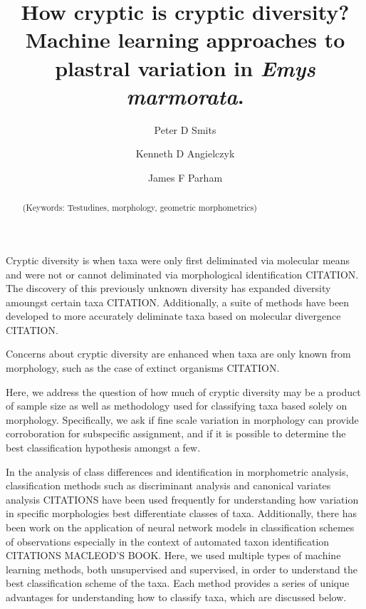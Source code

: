\documentclass[12pt,letterpaper]{article}\usepackage{graphicx, color}
\title{How cryptic is cryptic diversity? Machine learning approaches to plastral variation in \textit{Emys marmorata}.}
\author[1]{Peter D Smits}%
\author[2]{Kenneth D Angielczyk}%
\author[3]{James F Parham}%
\affil[1]{Committee on Evolution Biology, University of Chicago}
\affil[2]{Department of Geology, Field Museum of Natural History}
\affil[3]{Department of Geological Sciences, California State University -- Fullerton}
\renewcommand{\section}[1]{%
\bigskip
\begin{center}
\begin{Large}
\normalfont\scshape #1
\medskip
\end{Large}
\end{center}}
\begin{document}
\maketitle
{}


\begin{abstract}
\noindent (Keywords: Testudines, morphology, geometric morphometrics)
\end{abstract}


Cryptic diversity is when taxa were only first deliminated via molecular means and were not or cannot deliminated via morphological identification CITATION. The discovery of this previously unknown diversity has expanded diversity amoungst certain taxa CITATION. Additionally, a suite of methods have been developed to more accurately deliminate taxa based on molecular divergence CITATION.

Concerns about cryptic diversity are enhanced when taxa are only known from morphology, such as the case of extinct organisms CITATION. 

Here, we address the question of how much of cryptic diversity may be a product of sample size as well as methodology used for classifying taxa based solely on morphology. Specifically, we ask if fine scale variation in morphology can provide corroboration for subspecific assignment, and if it is possible to determine the best classification hypothesis amongst a few.

In the analysis of class differences and identification in morphometric analysis, classification methods such as discriminant analysis and canonical variates analysis CITATIONS have been used frequently for understanding how variation in specific morphologies best differentiate classes of taxa. Additionally, there has been work on the application of neural network models in classification schemes of observations especially in the context of automated taxon identification CITATIONS MACLEOD'S BOOK. Here, we used multiple types of machine learning methods, both unsupervised and supervised, in order to understand the best classification scheme of the taxa. Each method provides a series of unique advantages for understanding how to classify taxa, which are discussed below.
\end{document}
